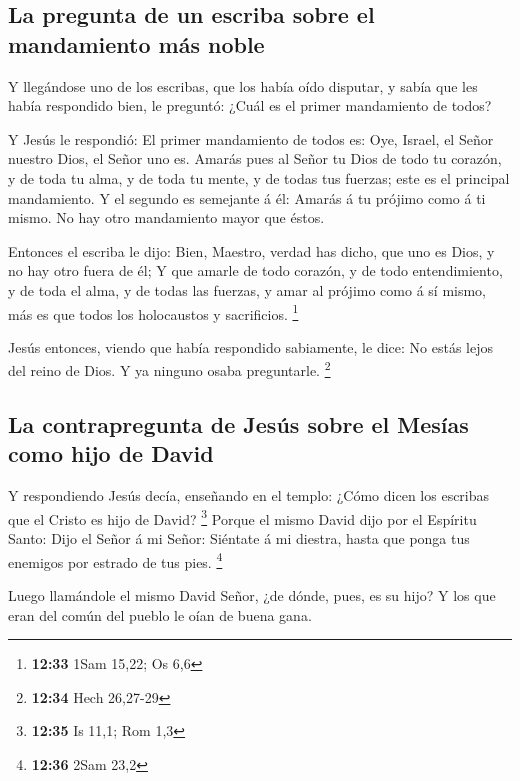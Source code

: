 \hypertarget{la-pregunta-de-un-escriba-sobre-el-mandamiento-muxe1s-noble}{%
\subsection{La pregunta de un escriba sobre el mandamiento más
noble}\label{la-pregunta-de-un-escriba-sobre-el-mandamiento-muxe1s-noble}}

 Y llegándose uno de los escribas, que los había oído
disputar, y sabía que les había respondido bien, le preguntó: ¿Cuál es
el primer mandamiento de todos?

 Y Jesús le respondió: El primer mandamiento de todos es:
Oye, Israel, el Señor nuestro Dios, el Señor uno es. 
Amarás pues al Señor tu Dios de todo tu corazón, y de toda tu alma, y de
toda tu mente, y de todas tus fuerzas; este es el principal mandamiento.
 Y el segundo es semejante á él: Amarás á tu prójimo como á
ti mismo. No hay otro mandamiento mayor que éstos.

 Entonces el escriba le dijo: Bien, Maestro, verdad has
dicho, que uno es Dios, y no hay otro fuera de él;  Y que
amarle de todo corazón, y de todo entendimiento, y de toda el alma, y de
todas las fuerzas, y amar al prójimo como á sí mismo, más es que todos
los holocaustos y sacrificios. \footnote{\textbf{12:33} 1Sam 15,22; Os
  6,6}

 Jesús entonces, viendo que había respondido sabiamente, le
dice: No estás lejos del reino de Dios. Y ya ninguno osaba preguntarle.
\footnote{\textbf{12:34} Hech 26,27-29}

\hypertarget{la-contrapregunta-de-jesuxfas-sobre-el-mesuxedas-como-hijo-de-david}{%
\subsection{La contrapregunta de Jesús sobre el Mesías como hijo de
David}\label{la-contrapregunta-de-jesuxfas-sobre-el-mesuxedas-como-hijo-de-david}}

 Y respondiendo Jesús decía, enseñando en el templo: ¿Cómo
dicen los escribas que el Cristo es hijo de David? \footnote{\textbf{12:35}
  Is 11,1; Rom 1,3}  Porque el mismo David dijo por el
Espíritu Santo: Dijo el Señor á mi Señor: Siéntate á mi diestra, hasta
que ponga tus enemigos por estrado de tus pies. \footnote{\textbf{12:36}
  2Sam 23,2}

 Luego llamándole el mismo David Señor, ¿de dónde, pues, es
su hijo? Y los que eran del común del pueblo le oían de buena gana.

